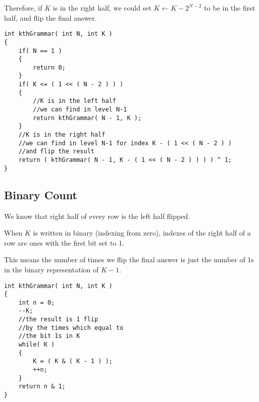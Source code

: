 Therefore, if $K$ is in the right half, we could set $K\gets K - 2 ^{N-2}$ to be in the first half, and flip the final answer.

\setcounter{lstlisting}{0}
\begin{lstlisting}[style=customc, caption={Recursion}]
int kthGrammar( int N, int K )
{
    if( N == 1 )
    {
        return 0;
    }
    if( K <= ( 1 << ( N - 2 ) ) )
    {
        //K is in the left half
        //we can find in level N-1
        return kthGrammar( N - 1, K );
    }
    //K is in the right half
    //we can find in level N-1 for index K - ( 1 << ( N - 2 ) )
    //and flip the result
    return ( kthGrammar( N - 1, K - ( 1 << ( N - 2 ) ) ) ) ^ 1;
}
\end{lstlisting}

\subsection{Binary Count}
We know that right half of every row is the left half flipped.

When $K$ is written in binary (indexing from zero),  indexes of the right half of a row are ones with the first bit set to 1.

This means the number of times we flip the final answer is just the number of 1s in the binary representation of $K-1$.

\setcounter{lstlisting}{0}
\begin{lstlisting}[style=customc, caption={Bit Counts}]
int kthGrammar( int N, int K )
{
    int n = 0;
    --K;
    //the result is 1 flip
    //by the times which equal to
    //the bit 1s in K
    while( K )
    {
        K = ( K & ( K - 1 ) );
        ++n;
    }
    return n & 1;
}
\end{lstlisting}